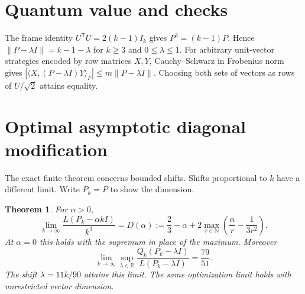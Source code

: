 \documentclass[11pt]{article}
\newtheorem{theorem}{Theorem}\newtheorem{lemma}[theorem]{Lemma}
\newcommand{\R}{\mathbb R}\newcommand{\LL}{\mathcal L}
\begin{document}
\section{Quantum value and checks}
The frame identity $U^\mathsf{T}U=2(k-1)I_k$ gives $P^2=(k-1)P$. Hence $\|P-\lambda I\|=k-1-\lambda$ for $k\ge3$ and $0\le\lambda\le1$. For arbitrary unit-vector strategies encoded by row matrices $X,Y$, Cauchy--Schwarz in Frobenius norm gives $|\langle X,(P-\lambda I)Y\rangle_F|\le m\|P-\lambda I\|$. Choosing both sets of vectors as rows of $U/\sqrt{2}$ attains equality.
\section{Optimal asymptotic diagonal modification}
The exact finite theorem concerns bounded shifts. Shifts proportional to $k$ have a different limit. Write $P_k=P$ to show the dimension.
\begin{theorem}\label{asym}
For $\alpha>0$,
\[
 \lim_{k\to\infty}\frac{L(P_k-\alpha k I)}{k^3}
 =D(\alpha):=\frac23-\alpha+2\max_{r\in\mathbb N}
             \left(\frac{\alpha}{r}-\frac{1}{3r^2}\right).
\]
At $\alpha=0$ this holds with the supremum in place of the maximum. Moreover
\[
 \lim_{k\to\infty}\sup_{\lambda\in\R}
 \frac{Q_k(P_k-\lambda I)}{L(P_k-\lambda I)}
 =\frac{79}{51}.
\]
The shift $\lambda=11k/90$ attains this limit. The same optimization limit holds with unrestricted vector dimension.
\end{theorem}
\end{document}
